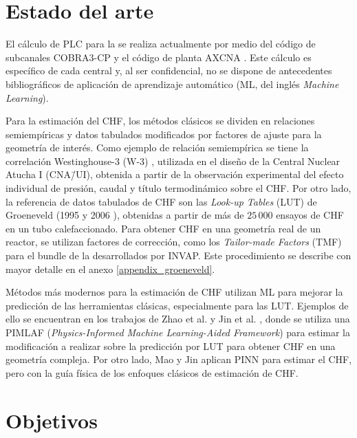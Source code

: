 \section{Estado del arte}

El cálculo de PLC para la \cna{} se realiza actualmente por medio del código de subcanales COBRA3-CP y el código de planta AXCNA \citep{axcna}. Este cálculo es específico de cada central y, al ser confidencial, no se dispone de antecedentes bibliográficos de aplicación de aprendizaje automático (ML, del inglés \textit{Machine Learning}).

Para la estimación del CHF, los métodos clásicos se dividen en relaciones semiempíricas y datos tabulados modificados por factores de ajuste para la geometría de interés. Como ejemplo de relación semiempírica se tiene la correlación Westinghouse-3 (W-3) \citep{tong1997boiling}, utilizada en el diseño de la Central Nuclear Atucha I (CNA\=/UI), obtenida a partir de la observación experimental del efecto individual de presión, caudal y título termodinámico sobre el CHF. Por otro lado, la referencia de datos tabulados de CHF son las \textit{Look-up Tables} (LUT) de Groeneveld (1995 \citep{GROENEVELD1996} y 2006 \citep{GROENEVELD2007}), obtenidas a partir de más de $25\,000$ ensayos de CHF en un tubo calefaccionado. Para obtener CHF en una geometría real de un reactor, se utilizan factores de corrección, como los \textit{Tailor-made Factors} (TMF) para el bundle de la \cna{} desarrollados por INVAP. Este procedimiento se describe con mayor detalle en el anexo \ref{appendix_groeneveld}.

Métodos más modernos para la estimación de CHF utilizan ML para mejorar la predicción de las herramientas clásicas, especialmente para las LUT. Ejemplos de ello se encuentran en los trabajos de Zhao et al. \citep{ZHAO2020, ZHAO2021} y Jin et al. \citep{JIN2022}, donde se utiliza una PIMLAF (\textit{Physics-Informed Machine Learning-Aided Framework}) para estimar la modificación a realizar sobre la predicción por LUT para obtener CHF en una geometría compleja. Por otro lado, Mao y Jin \citep{MAO2024} aplican PINN para estimar el CHF, pero con la guía física de los enfoques clásicos de estimación de CHF.


\section{Objetivos}
\label{sec:objetivos}


